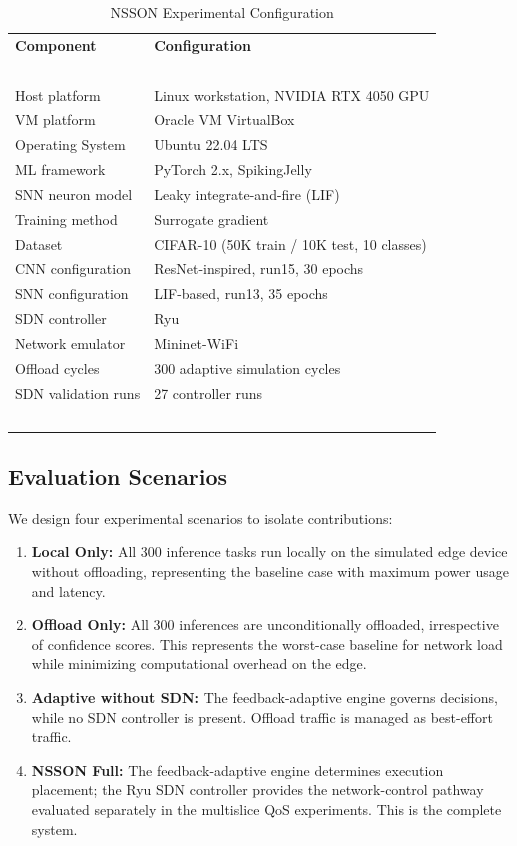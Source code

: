 \documentclass[journal]{IEEEtran}
\begin{document}
\begin{table}[H]
\caption{NSSON Experimental Configuration}
\label{tab:env}
\centering
\renewcommand{\arraystretch}{1.2}
\begin{tabular}{p{3.5cm}p{4.3cm}}
\toprule
\textbf{Component} & \textbf{Configuration} \\\ \\
\midrule
Host platform & Linux workstation, NVIDIA RTX 4050 GPU \\
VM platform & Oracle VM VirtualBox \\
Operating System & Ubuntu 22.04 LTS\\
ML framework & PyTorch 2.x, SpikingJelly \\
SNN neuron model & Leaky integrate-and-fire (LIF) \\
Training method & Surrogate gradient \\
Dataset & CIFAR-10 (50K train / 10K test, 10 classes) \\
CNN configuration & ResNet-inspired, run15, 30 epochs \\
SNN configuration & LIF-based, run13, 35 epochs \\
SDN controller & Ryu \\
Network emulator & Mininet-WiFi \\
Offload cycles & 300 adaptive simulation cycles \\
SDN validation runs & 27 controller runs \\\ \\
\bottomrule
\end{tabular}
\end{table}

\subsection{Evaluation Scenarios}
We design four experimental scenarios to isolate contributions:
\begin{enumerate}
\item \textbf{Local Only:} All 300 inference tasks run locally on the simulated edge device without offloading, representing the baseline case with maximum power usage and latency.
\item \textbf{Offload Only:} All 300 inferences are unconditionally offloaded, irrespective of confidence scores. This represents the worst-case baseline for network load while minimizing computational overhead on the edge.
\item \textbf{Adaptive without SDN:} The feedback-adaptive engine governs decisions, while no SDN controller is present. Offload traffic is managed as best-effort traffic.
\item \textbf{NSSON Full:} The feedback-adaptive engine determines execution placement; the Ryu SDN controller provides the network-control pathway evaluated separately in the multislice QoS experiments.
  This is the complete system.
\end{enumerate}
\end{document}
